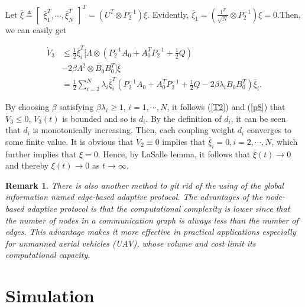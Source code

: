 \documentclass[english]{cccconf}
\newtheorem{remark}{Remark}
\begin{document}
Let $\overline \xi \triangleq \begin{bmatrix} \overline \xi_1^T,\cdots, \overline \xi_N^T\end{bmatrix}^T=(U^T \otimes P_2^{-1}) \xi$. Evidently, $\overline \xi_1 = (\frac{1^T}{\sqrt{N}} \otimes P_2^{-1})\xi = 0$.Then, we can easily get

\begin{equation}
  \label{p8}
  \begin{aligned}
\dot V_3
&\le \frac{1}{2}\overline \xi^T_i [ \Lambda \otimes \left( P^{-1}_{2} A_{0} + A_{0}^T P^{-1}_{2} + \frac{1}{2}Q \right)\\ 
&- 2 \beta \Lambda^2 \otimes B_{0} B_{0}^{T}]\overline \xi \\
&= \frac{1}{2}\sum_{i=2}^{N}\lambda_i \overline \xi_i^T(P^{-1}_{2} A_{0} + A_{0}^T P^{-1}_{2} + \frac{1}{2}Q- 2 \beta \lambda_i B_{0} B_{0}^{T}) \overline \xi_i.  
  \end{aligned}
\end{equation}

By choosing $\beta$ satisfying $\beta \lambda_i \geq 1$, $i=1,\cdots, N$, it follows (\ref{T2}) and (\ref{p8}) that $\dot V_3 \leq 0$, $V_3(t)$ is bounded and so is $d_i$. By the definition of $d_i$, it can be seen that $d_i$ is monotonically increasing. Then, each coupling weight $d_i$ converges to some finite value. It is obvious that $\dot V_2 \equiv 0$ implies that $\overline \xi_i = 0, i = 2,\cdots, N$, which further implies that $\xi = 0$. Hence, by LaSalle lemma, it follows that $\overline \xi(t) \to 0 $ and thereby $\xi(t) \to 0$ as $t \to \infty$.
 
\begin{remark}
There is also another method to git rid of the using of the global information named edge-based adaptive protocol. The advantages of the node-based adaptive protocol is that the computational complexity is lower since that the number of nodes in a communication graph is always less than the number of edges. This advantage makes it more effective in practical applications especially for unmanned aerial vehicles (UAV), whose volume and cost limit its computational capacity. 
\end{remark}










\section{Simulation}
\end{document}
